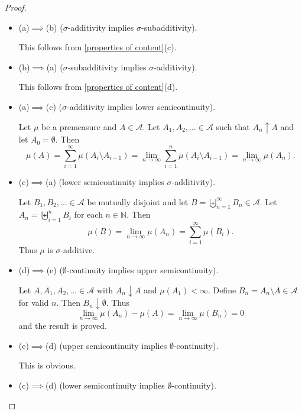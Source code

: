 \begin{proof}
~
    \begin{itemize}
        \item (a)$\implies$(b) ($\sigma$-additivity implies $\sigma$-subadditivity).
        
        This follows from \cref{properties of content}(c).
        
        \item (b)$\implies$(a) ($\sigma$-subadditivity implies $\sigma$-additivity).
        
        This follows from \cref{properties of content}(d).
        
        \item (a)$\implies$(c) ($\sigma$-additivity implies lower semicontinuity).
        
        Let $\mu$ be a premeasure and $A\in\mathcal{A}$. Let $A_1,A_2,\ldots\in\mathcal{A}$ such that $A_n\uparrow A$ and let $A_0=\emptyset$. Then
        $$\mu(A)=\sum_{i=1}^\infty \mu(A_i\setminus A_{i-1})=\lim_{n\to\infty}\sum_{i=1}^n\mu(A_i\setminus A_{i-1})=\lim_{n\to\infty}\mu(A_n).$$
        
        \item (c)$\implies$(a) (lower semicontinuity implies $\sigma$-additivity).
        
        Let $B_1,B_2,\ldots\in\mathcal{A}$ be mutually disjoint and let $B=\biguplus_{n=1}^\infty B_n\in\mathcal{A}$. Let $A_n=\biguplus_{i=1}^n B_i$ for each $n\in\mathbb{N}$. Then
        $$\mu(B)=\lim_{n\to\infty}\mu(A_n)=\sum_{i=1}^\infty\mu(B_i).$$
        Thus $\mu$ is $\sigma$-additive.
        
        \item (d)$\implies$(e) ($\emptyset$-continuity implies upper semicontinuity).
        
        Let $A,A_1,A_2,\ldots\in\mathcal{A}$ with $A_n\downarrow A$ and $\mu(A_1)<\infty$. Define $B_n=A_n\setminus A\in\mathcal{A}$ for valid $n$. Then $B_n\downarrow\emptyset$. Thus
        $$\lim_{n\to\infty}\mu(A_n)-\mu(A)=\lim_{n\to\infty}\mu(B_n)=0$$
        and the result is proved.
        
        \item (e)$\implies$(d) (upper semicontinuity implies $\emptyset$-continuity).
        
        This is obvious.
        
        \item (c)$\implies$(d) (lower semicontinuity implies $\emptyset$-continuity).
        

\end{itemize}
\end{proof}
